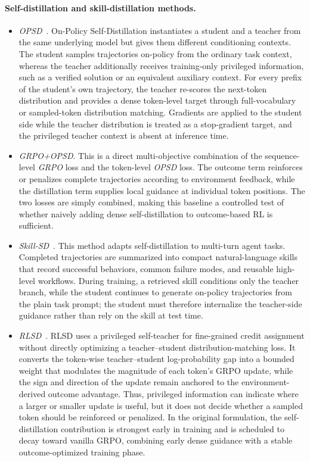 \documentclass{llmxive}
\begin{document}
\paragraph{Self-distillation and skill-distillation methods.}
\begin{itemize}
    \item \textit{OPSD}~\citep{zhao2026opsd}. On-Policy Self-Distillation instantiates a student and a teacher from the same underlying model but gives them different conditioning contexts. The student samples trajectories on-policy from the ordinary task context, whereas the teacher additionally receives training-only privileged information, such as a verified solution or an equivalent auxiliary context. For every prefix of the student's own trajectory, the teacher re-scores the next-token distribution and provides a dense token-level target through full-vocabulary or sampled-token distribution matching. Gradients are applied to the student side while the teacher distribution is treated as a stop-gradient target, and the privileged teacher context is absent at inference time.

    \item \textit{GRPO+OPSD}. This is a direct multi-objective combination of the sequence-level \textit{GRPO} loss and the token-level \textit{OPSD} loss. The outcome term reinforces or penalizes complete trajectories according to environment feedback, while the distillation term supplies local guidance at individual token positions. The two losses are simply combined, making this baseline a controlled test of whether naively adding dense self-distillation to outcome-based RL is sufficient.

    \item \textit{Skill-SD}~\citep{wang2026skillsd}. This method adapts self-distillation to multi-turn agent tasks. Completed trajectories are summarized into compact natural-language skills that record successful behaviors, common failure modes, and reusable high-level workflows. During training, a retrieved skill conditions only the teacher branch, while the student continues to generate on-policy trajectories from the plain task prompt; the student must therefore internalize the teacher-side guidance rather than rely on the skill at test time. 

    \item \textit{RLSD}~\citep{yang2026rlsd}. RLSD uses a privileged self-teacher for fine-grained credit assignment without directly optimizing a teacher--student distribution-matching loss. It converts the token-wise teacher--student log-probability gap into a bounded weight that modulates the magnitude of each token's GRPO update, while the sign and direction of the update remain anchored to the environment-derived outcome advantage. Thus, privileged information can indicate where a larger or smaller update is useful, but it does not decide whether a sampled token should be reinforced or penalized. In the original formulation, the self-distillation contribution is strongest early in training and is scheduled to decay toward vanilla GRPO, combining early dense guidance with a stable outcome-optimized training phase.


\end{itemize}
\end{document}
